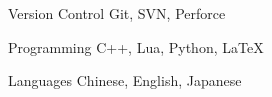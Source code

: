 

\begin{cvskills}

  \cvskill
    {Version Control} %
    {Git, SVN, Perforce} %

  \cvskill
    {Programming} %
    {C++, Lua, Python, LaTeX} %

  \cvskill
    {Languages} %
    {Chinese, English, Japanese} %

\end{cvskills}
